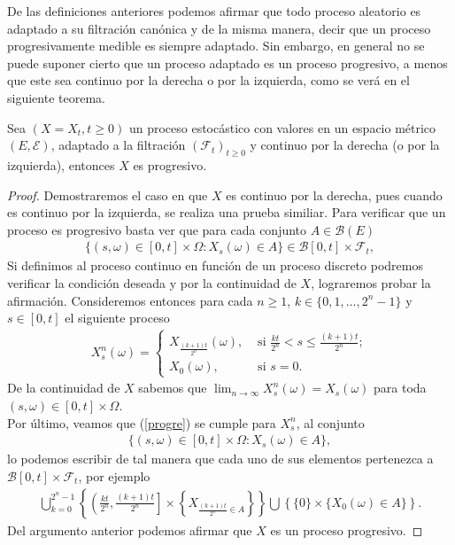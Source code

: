 De las definiciones anteriores podemos afirmar que todo proceso aleatorio es adaptado a su filtración canónica y de la misma manera, decir que un proceso progresivamente medible es siempre adaptado. Sin embargo, en general no se puede suponer cierto que un proceso adaptado es un proceso progresivo, a menos que este sea continuo por la derecha o por la izquierda, como se verá en el siguiente teorema. \\

\begin{theorem}
	Sea $(X = X_t, t \geq 0)$ un proceso estocástico con valores en un espacio métrico $(E, \mathcal{E})$, adaptado a la filtración $(\mathcal{F}_t)_{t \geq 0}$ y continuo por la derecha (o por la izquierda), entonces $X$ es progresivo.
\end{theorem}
\begin{proof}
	Demostraremos el caso en que $X$ es continuo por la derecha, pues cuando es continuo por la izquierda, se realiza una prueba similiar. Para verificar que un proceso es progresivo basta ver que para cada conjunto $A \in \mathcal{B}(E)$
	\begin{align}
	\{ (s, \omega) \in [0, t] \times \Omega : X_s(\omega) \in A \} \in \mathcal{B}[0, t] \times \mathcal{F}_t, \label{progre}
	\end{align}
	Si definimos al proceso continuo en función de un proceso discreto podremos verificar la condición deseada y por la continuidad de $X$, lograremos probar la afirmación. Consideremos entonces para cada $n \geq 1$, $k \in \{ 0, 1, \ldots, 2^n - 1 \}$ y $s \in [0, t]$ el siguiente proceso
	\begin{align*}
	X_s^n (\omega) = 
	\begin{cases}
	X_{\frac{(k+1)t}{2^n}} (\omega), & \text{ si } \frac{kt}{2^n} < s \leq \frac{(k+1)t}{2^n}; \\
	X_0 (\omega), & \text{ si } s = 0.
	\end{cases}
	\end{align*}
	De la continuidad de $X$ sabemos que $\lim_{n \rightarrow \infty} X_s^n (\omega) = X_s (\omega)$ para toda $(s, \omega) \in [0, t] \times \Omega$. \\
	
	Por último, veamos que (\ref{progre}) se cumple para $X_s^n$, al conjunto
	\begin{align*}
	\{ (s, \omega) \in [0, t] \times \Omega : X_s(\omega) \in A \},
	\end{align*}
	lo podemos escribir de tal manera que cada uno de sus elementos pertenezca a $\mathcal{B}[0, t] \times \mathcal{F}_t$, por ejemplo
	\begin{align*}
	\bigcup_{k = 0}^{2^n - 1} \left\{ \left( \frac{kt}{2^n}, \frac{(k+1)t}{2^n} \right] \times \left\{ X_{\frac{(k+1)t}{2^n} \in A} \right\}  \right\} \bigcup\left\{ \{0\} \times \{X_0(\omega) \in A\} \right\}.
	\end{align*}
	Del argumento anterior podemos afirmar que $X$ es un proceso progresivo.
\end{proof}

